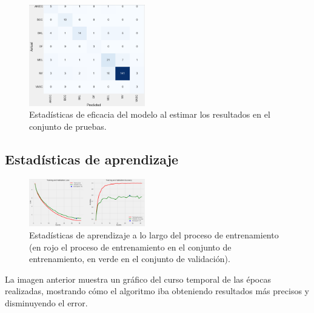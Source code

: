     \begin{figure}[ht]%
		\begin{center}
		\includegraphics[width=0.45\textwidth]{./Graphics/confussion_matrix.png}
		\caption{Estadísticas de eficacia del modelo al estimar los resultados en el conjunto de pruebas.\label{fig:confussion_matrix}}
		\end{center}
		\end{figure}
    
    

	\subsection{Estadísticas de aprendizaje}\label{sub:learning_statistics}
		\begin{figure}[ht]%
      \begin{center}
      \includegraphics[width=0.45\textwidth]{./Graphics/training_validation.png}
      \caption{Estadísticas de aprendizaje a lo largo del proceso de entrenamiento (en rojo el proceso de entrenamiento en el conjunto de entrenamiento, en verde en el conjunto de validación).\label{fig:training_validation_loss}}
      \end{center}
		\end{figure}
  
La imagen anterior muestra un gráfico del curso temporal de las épocas realizadas, mostrando cómo el algoritmo iba obteniendo resultados más precisos y disminuyendo el error.

